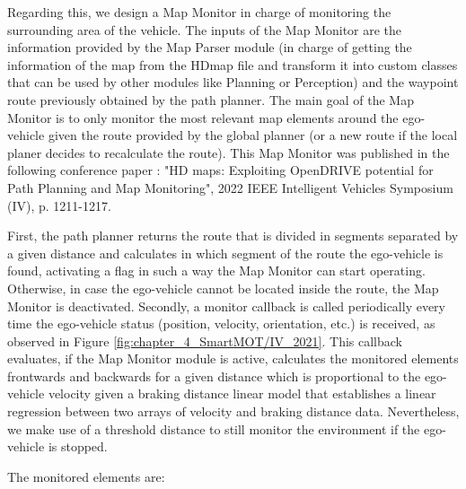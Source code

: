 Regarding this, we design a Map Monitor in charge of monitoring the surrounding area of the vehicle. The inputs of the Map Monitor are the information provided by the Map Parser module (in charge of getting the information of the map from the \ac{HDmap} file and transform it into custom classes that can be used by other modules like Planning or Perception) and the waypoint route previously obtained by the path planner. The main goal of the Map Monitor is to only monitor the most relevant map elements around the ego-vehicle given the route provided by the global planner (or a new route if the local planer decides to recalculate the route). This Map Monitor was published in the following conference paper \cite{diaz2022hd}: "HD maps: Exploiting OpenDRIVE potential for Path Planning and Map Monitoring", 2022 IEEE Intelligent Vehicles Symposium (IV), p. 1211-1217. 

First, the path planner returns the route that is divided in segments separated by a given distance and calculates in which segment of the route the ego-vehicle is found, activating a flag in such a way the Map Monitor can start operating. Otherwise, in case the ego-vehicle cannot be located inside the route, the Map Monitor is deactivated. Secondly, a monitor callback is called periodically every time the ego-vehicle status (position, velocity, orientation, etc.) is received, as observed in Figure \ref{fig:chapter_4_SmartMOT/IV_2021}. This callback evaluates, if the Map Monitor module is active, calculates the monitored elements frontwards and backwards for a given distance which is proportional to the ego-vehicle velocity given a braking distance linear model that establishes a linear regression between two arrays of velocity and braking distance data. Nevertheless, we make use of a threshold distance to still monitor the environment if the ego-vehicle is stopped. %

The monitored elements are:

